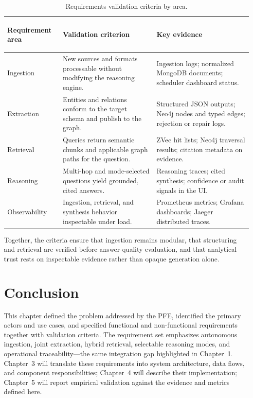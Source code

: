 \begin{table}[H]
\centering
\small
\setlength{\tabcolsep}{5pt}
\renewcommand{\arraystretch}{1.35}
\begin{tabularx}{\textwidth}{@{}>{\bfseries\raggedright\arraybackslash}p{2.5cm}>{\raggedright\arraybackslash}X>{\raggedright\arraybackslash}p{3.85cm}@{}}
\toprule
\rowcolor{lightblue}
Requirement area & Validation criterion & Key evidence \\
\midrule
Ingestion & New sources and formats processable without modifying the reasoning engine. & Ingestion logs; normalized MongoDB documents; scheduler dashboard status. \\
Extraction & Entities and relations conform to the target schema and publish to the graph. & Structured JSON outputs; Neo4j nodes and typed edges; rejection or repair logs. \\
Retrieval & Queries return semantic chunks and applicable graph paths for the question. & ZVec hit lists; Neo4j traversal results; citation metadata on evidence. \\
Reasoning & Multi-hop and mode-selected questions yield grounded, cited answers. & Reasoning traces; cited synthesis; confidence or audit signals in the UI. \\
Observability & Ingestion, retrieval, and synthesis behavior inspectable under load. & Prometheus metrics; Grafana dashboards; Jaeger distributed traces. \\
\bottomrule
\end{tabularx}
\caption{Requirements validation criteria by area.}
\label{tab:requirements-validation}
\end{table}

Together, the criteria ensure that ingestion remains modular, that structuring and retrieval are verified before answer-quality evaluation, and that analytical trust rests on inspectable evidence rather than opaque generation alone.

\section{Conclusion}

This chapter defined the problem addressed by the PFE, identified the primary actors and use cases, and specified functional and non-functional requirements together with validation criteria. The requirement set emphasizes autonomous ingestion, joint extraction, hybrid retrieval, selectable reasoning modes, and operational traceability---the same integration gap highlighted in Chapter~1. Chapter~3 will translate these requirements into system architecture, data flows, and component responsibilities; Chapter~4 will describe their implementation; Chapter~5 will report empirical validation against the evidence and metrics defined here.
